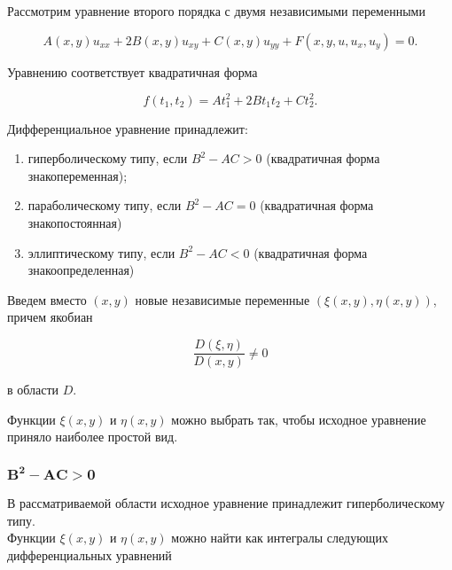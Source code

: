 	    Рассмотрим уравнение второго порядка с двумя независимыми переменными

	    \begin{equation}
	        A \left( x, y \right) u_{xx} + 2 B \left( x, y \right) u_{xy} + C \left( x, y \right) u_{yy} + F \left( x, y, u, u_{x}, u_{y} \right) = 0.
	    \end{equation}

	    Уравнению соответствует квадратичная форма

	    \begin{equation}
	        f \left( t_{1}, t_{2} \right) = A t^{2}_{1} + 2 B t_{1} t_{2} + C t^{2}_{2}.
	    \end{equation}

	    Дифференциальное уравнение принадлежит:

	    \begin{enumerate}
	        \item гиперболическому типу, если $B^{2} - AC > 0$ (квадратичная форма знакопеременная);
	        \item параболическому типу, если $B^{2} - AC = 0$ (квадратичная форма знакопостоянная)
	        \item эллиптическому типу, если $B^{2} - AC < 0$ (квадратичная форма знакоопределенная)
	    \end{enumerate}

	    Введем вместо $\left( x, y \right)$ новые независимые переменные $\left( \xi \left( x, y \right), \eta \left( x, y \right) \right)$, причем якобиан

	    \begin{equation}
	        \frac{D \left( \xi, \eta \right)}{D \left( x, y \right)} \neq 0
	    \end{equation}

	    в области $D$.

	    Функции $\xi \left( x, y \right)$ и $\eta \left( x, y \right)$ можно выбрать так, чтобы исходное уравнение приняло наиболее простой вид.

	    \subsubsection*{$\mathbf{B^{2} - AC > 0}$}

	        В рассматриваемой области исходное уравнение принадлежит гиперболическому типу.\\

	        Функции $\xi \left( x, y \right)$ и $\eta \left( x, y \right)$ можно найти как интегралы следующих дифференциальных уравнений

